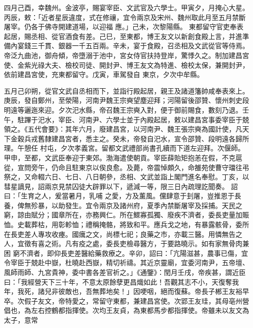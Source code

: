 \begin{pinyinscope}
四月己酉，幸魏州。金波亭，賜宴宰臣、文武官及六學士。甲寅夕，月掩心大星。丙辰，敕：「近者星辰違度，式在修禳，宜令兩京及宋州、魏州取此月至五月禁斷屠宰。仍各于佛寺開建道場，以迎福
 應。」己未，次黎陽縣。
 東都留守官吏奉表起居，賜丞相、從官酒食有差。己巳，至東都，博王友文以新創食殿上言，并進準備內宴錢三千貫、銀器一千五百兩。辛未，宴于食殿，召丞相及文武從官等侍焉。帝泛九曲池，御舟傾，帝墮溺于池中，宮女侍官扶持登岸，驚悸久之。制加建昌宮使、金紫光祿大夫、檢校司徒、開封尹、博王友文為特進、檢校太保，兼開封尹，依前建昌宮使，充東都留守。戊寅，車駕發自
 東京，夕次中牟縣。


五月己卯朔，從官文武自丞相而下，並詣行殿起居，親王及諸道籓帥咸奉表來上。庚辰，發自鄭州，至滎陽，河南尹魏王宗奭望塵迎拜；河陽留後邵贊、懷州刺史段明遠等邐迤來迎。夕次汜水縣，帝召魏王宗奭入對，便于御前賜食，數刻乃退。壬午，駐蹕于汜水，宰臣、河南尹、六學士並于內殿起居，敕以建昌宮事委宰臣于兢領之。《五代會要》：其年六月，廢建昌宮，以河南尹、魏王張宗奭為國計使，凡天下金穀兵戎舊隸建昌宮者，悉主之。癸未，帝發自汜水，宣令邵贊、段明遠各歸所理。午憩任
 村屯，夕次孝義宮。留都文武禮部尚書孔續而下道左迎拜。次偃師。甲申，至都，文武臣奉迎于東郊。渤海遣使朝貢。宰臣薛貽矩抱恙在假，不克扈從，宣問旁午，仍命且駐東京以俟良愈。及薨，帝震悼頗久，命雒苑使曹守璫往弔祭之，又命輟六日、七日、八日朝參，丞相、文武並詣上閣門進名奉慰。丁亥，以彗星謫見，詔兩京見禁囚徒大辟罪以下，遞減一等，限三日內疏理訖聞奏。
 詔曰：「生育之人，爰當暑月，乳哺
 之愛，方及薰風。儻肆意于刲屠，豈推恩于長養，俾無殄暴，以助發生。宜令兩京及諸州府，夏季內禁斷屠宰及採捕。天民之窮，諒由賦分；國章所在，亦務興仁。所在鰥寡孤獨、廢疾不濟者，委長吏量加賑恤。史載葬枯，用彰軫恤；禮稱掩骼，將致和平。應兵戈之地，有暴露骸骨，委所在長吏差人專攻收瘞。國癘之文，尚標七祀；良藥之市，亦載三醫。用憐無告之人，宜徵有喜之術。凡有疫之處，委長吏檢尋醫方，于要路曉示。如有家無骨肉兼困
 窮不濟者，即仰長吏差醫給藥救療之。辛卯，詔曰：「亢陽滋甚，農事已傷，宜令宰臣于兢赴中嶽，杜曉赴西嶽，精切祈禱。其近京靈廟，宜委河南尹，五帝壇、風師雨師、九宮貴神，委中書各差官祈之。」《通鑒》：閏月壬戌，帝疾甚，謂近臣曰：「我經營天下三十年，不意太原餘孽更昌熾如此！吾觀其志不小，天復奪我年，我死，諸兒非彼敵也，吾無葬地矣！」因哽咽，絕而復蘇。帝長子郴王友裕早卒。次假子友文，帝特愛之，常留守東都，兼建昌宮使。次郢王友珪，其母亳州營倡也，為左右控鶴都指揮使。次均王友貞，為東都馬步都指揮使。帝雖未以友文為太子，意常

\end{pinyinscope}
